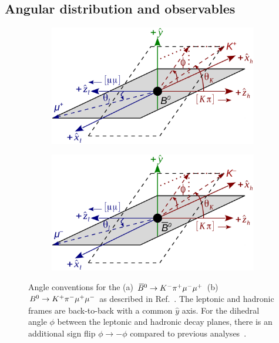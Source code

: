 \subsection{Angular distribution and observables}
\label{sec:kpimm:angular-distribution}

\begin{figure}
\centering
\begin{subfigure}{0.49\textwidth}
\includegraphics[width=\textwidth]{figs/kpimm/angular-distribution/angles_bz.pdf}
\caption{}
\label{fig:angle_conventions:bzb}
\end{subfigure}
\begin{subfigure}{0.49\textwidth}
\centering
\includegraphics[width=\textwidth]{figs/kpimm/angular-distribution/angles_bzb.pdf}
\caption{}
\label{fig:angle_conventions:bz}
\end{subfigure}
\caption{Angle conventions for the (a) ${{\kern 0.18em\overline{\kern -0.18em B}{}}{}^0} \rightarrow {\ensuremath{{K}^-}} {\ensuremath{{\pi}^+}} {\ensuremath{\mu^-}} {\ensuremath{\mu^+}}$ (b)  ${{B}^0} \rightarrow {\ensuremath{{K}^+}} {\ensuremath{{\pi}^-}} {\ensuremath{\mu^+}} {\ensuremath{\mu^-}}$ as described in Ref.~\cite{biplab}. The leptonic and hadronic frames are back-to-back with a common $\hat{y}$ axis. For the dihedral angle $\phi$ between the leptonic and hadronic decay planes, there is an additional sign flip $\phi\to -\phi$ compared to previous \lhcb analyses~\cite{LHCB-PAPER-2011-020,LHCB-PAPER-2013-019,LHCB-PAPER-2013-037,LHCB-PAPER-2015-051}.
}
\label{fig:angle_conventions}
\end{figure}

